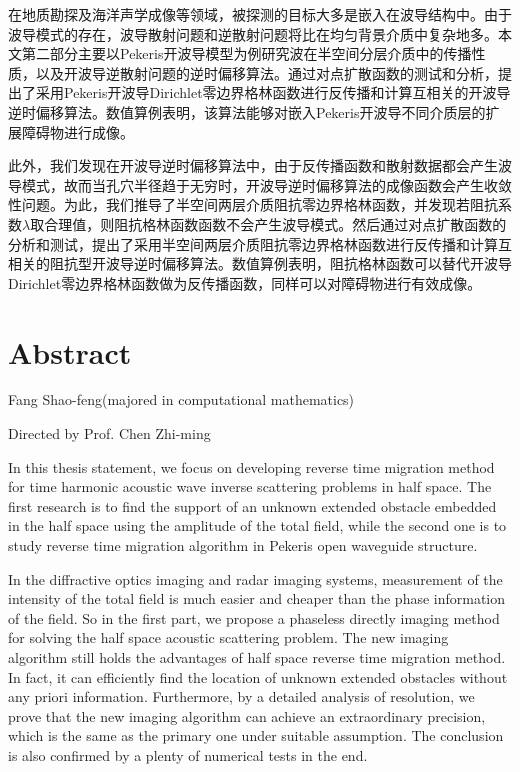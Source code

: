 在地质勘探及海洋声学成像等领域，被探测的目标大多是嵌入在波导结构中。由于波导模式的存在，波导散射问题和逆散射问题将比在均匀背景介质中复杂地多。本文第二部分主要以Pekeris开波导模型为例研究波在半空间分层介质中的传播性质，以及开波导逆散射问题的逆时偏移算法。通过对点扩散函数的测试和分析，提出了采用Pekeris开波导Dirichlet零边界格林函数进行反传播和计算互相关的开波导逆时偏移算法。数值算例表明，该算法能够对嵌入Pekeris开波导不同介质层的扩展障碍物进行成像。

此外，我们发现在开波导逆时偏移算法中，由于反传播函数和散射数据都会产生波导模式，故而当孔穴半径趋于无穷时，开波导逆时偏移算法的成像函数会产生收敛性问题。为此，我们推导了半空间两层介质阻抗零边界格林函数，并发现若阻抗系数$\lambda$取合理值，则阻抗格林函数函数不会产生波导模式。然后通过对点扩散函数的分析和测试，提出了采用半空间两层介质阻抗零边界格林函数进行反传播和计算互相关的阻抗型开波导逆时偏移算法。数值算例表明，阻抗格林函数可以替代开波导Dirichlet零边界格林函数做为反传播函数，同样可以对障碍物进行有效成像。



\chapter{Abstract}%

\begin{center}
Fang Shao-feng(majored in computational mathematics)

Directed by Prof. Chen Zhi-ming

\end{center}

In this thesis statement, we focus on developing reverse time migration method for time harmonic acoustic wave inverse scattering problems in half space. The first research is to find the support of an unknown extended obstacle embedded in the half space using the amplitude of the total field, while the second one is to study reverse time migration algorithm in Pekeris open waveguide structure.

In the diffractive optics imaging and radar imaging systems, measurement of the intensity of the total field is much easier and cheaper than the phase information of the field. So in the first part, we propose a phaseless directly imaging method for solving the half  space acoustic scattering problem. The new imaging algorithm still holds the advantages of half space reverse time migration method. In fact, it can efficiently find the location of unknown extended obstacles without any priori information. Furthermore, by a detailed analysis of resolution, we prove that the new imaging algorithm can achieve an extraordinary precision, which is the same as the primary one under suitable assumption. The conclusion is also confirmed by a plenty of numerical tests in the end.

